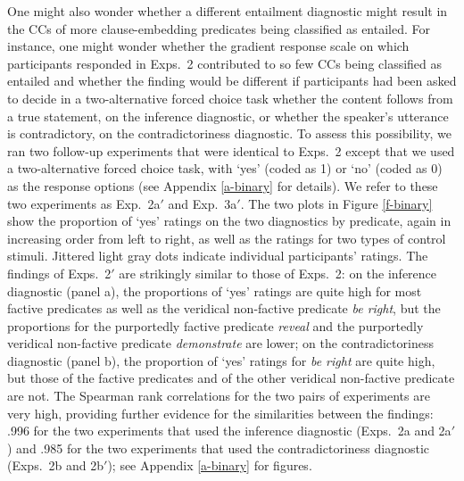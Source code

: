 \documentclass[11pt,fleqn]{article}
\newcommand{\6}{\mbox{$[\hspace*{-.6mm}[$}}
\newcommand{\9}{\mbox{$]\hspace*{-.6mm}]$}}
\begin{document}
{One might also wonder whether a different entailment diagnostic might result in the CCs of more clause-embedding predicates being classified as entailed. For instance, one might wonder whether the gradient response scale on which participants responded in Exps.~2 contributed to so few CCs being classified as entailed and whether the finding would be different if participants had been asked to decide in a two-alternative forced choice task whether the content follows from a true statement, on the inference diagnostic, or whether the speaker's utterance is contradictory, on the contradictoriness diagnostic. To assess this possibility, we ran two follow-up experiments that were identical to Exps.~2 except that we used a two-alternative forced choice task, with `yes' (coded as 1) or `no' (coded as 0) as the response options (see Appendix \ref{a-binary} for details). We refer to these two experiments as Exp.~2a$'$ and Exp.~3a$'$. The two plots in Figure \ref{f-binary} show the proportion of `yes' ratings on the two diagnostics by predicate, again in increasing order from left to right, as well as the ratings for two types of control stimuli. Jittered light gray dots indicate individual participants' ratings. The findings of Exps.~2$'$ are strikingly similar to those of Exps.~2: on the inference diagnostic (panel a), the proportions of `yes' ratings are quite high for most factive predicates as well as the veridical non-factive predicate {\em be right}, but the proportions for the purportedly factive predicate {\em reveal} and the purportedly veridical non-factive predicate {\em demonstrate} are lower; on the contradictoriness diagnostic (panel b), the proportion of `yes' ratings for {\em be right} are quite high, but those of the factive predicates and of the other veridical non-factive predicate are not. The Spearman rank correlations for the two pairs of experiments are very high, providing further evidence for the similarities between the findings: .996 for the two experiments that used the inference diagnostic (Exps.~2a and 2a$'$) and .985 for the two experiments that used the contradictoriness diagnostic (Exps.~2b and 2b$'$); see Appendix \ref{a-binary} for figures.

\begin{figure}[H]
\centering


\end{figure}}
\end{document}
